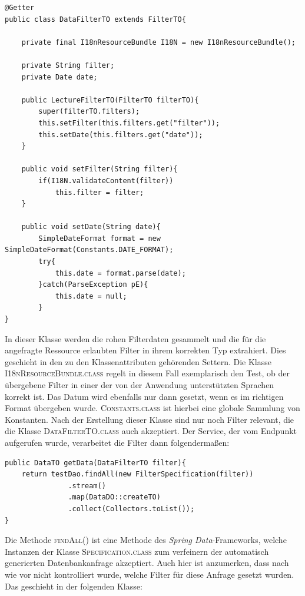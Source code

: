 \begin{lstlisting}[caption={Ressourcenspezifisches Filter Objekt}]
@Getter
public class DataFilterTO extends FilterTO{

    private final I18nResourceBundle I18N = new I18nResourceBundle();

    private String filter;
    private Date date;
    
    public LectureFilterTO(FilterTO filterTO){
        super(filterTO.filters);
        this.setFilter(this.filters.get("filter"));
        this.setDate(this.filters.get("date"));
    }
 
    public void setFilter(String filter){
        if(I18N.validateContent(filter))
            this.filter = filter;
    }
    
    public void setDate(String date){
        SimpleDateFormat format = new SimpleDateFormat(Constants.DATE_FORMAT);
        try{
            this.date = format.parse(date);
        }catch(ParseException pE){
            this.date = null;
        }
}
\end{lstlisting}

In dieser Klasse werden die rohen Filterdaten gesammelt und die für die angefragte Ressource erlaubten Filter in ihrem korrekten Typ extrahiert. Dies geschieht in den zu den Klassenattributen gehörenden Settern. Die Klasse \textsc{I18nResource\-Bundle.class} regelt in diesem Fall exemplarisch den Test, ob der übergebene Filter in einer der von der Anwendung unterstützten Sprachen korrekt ist. Das Datum wird ebenfalls nur dann gesetzt, wenn es im richtigen Format übergeben wurde. \textsc{Constants\-.class} ist hierbei eine globale Sammlung von Konstanten. Nach der Erstellung dieser Klasse sind nur noch Filter relevant, die die Klasse \textsc{DataFilterTO.class} auch akzeptiert. Der Service, der vom Endpunkt aufgerufen wurde, verarbeitet die Filter dann folgendermaßen:

\begin{lstlisting}[caption={Serviceschicht}]
public DataTO getData(DataFilterTO filter){
    return testDao.findAll(new FilterSpecification(filter))
               .stream()
               .map(DataDO::createTO)
               .collect(Collectors.toList());
}
\end{lstlisting}

Die Methode \textsc{findAll()} ist eine Methode des \textit{Spring Data}-Frameworks, welche Instanzen der Klasse \textsc{Specification.class} zum verfeinern der automatisch generierten Datenbankanfrage akzeptiert. Auch hier ist anzumerken, dass nach wie vor nicht kontrolliert wurde, welche Filter für diese Anfrage gesetzt wurden. Das geschieht in der folgenden Klasse:

